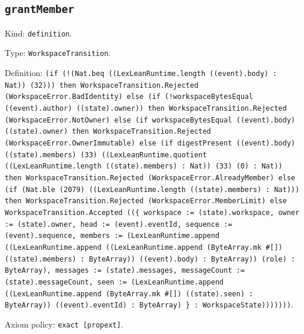 \documentclass[11pt]{article}
\begin{document}
\subsection*{\texttt{grantMember}}
\noindent Kind: \texttt{definition}.\par
\noindent Type: \texttt{WorkspaceTransition}.\par
\noindent Definition: \texttt{(if (!(Nat.beq ((LexLeanRuntime.length ((event).body) : Nat)) (32))) then WorkspaceTransition.Rejected (WorkspaceError.BadIdentity) else (if (!workspaceBytesEqual ((event).author) ((state).owner)) then WorkspaceTransition.Rejected (WorkspaceError.NotOwner) else (if workspaceBytesEqual ((event).body) ((state).owner) then WorkspaceTransition.Rejected (WorkspaceError.OwnerImmutable) else (if digestPresent ((event).body) ((state).members) (33) ((LexLeanRuntime.quotient ((LexLeanRuntime.length ((state).members) : Nat)) (33) (0) : Nat)) then WorkspaceTransition.Rejected (WorkspaceError.AlreadyMember) else (if (Nat.ble (2079) ((LexLeanRuntime.length ((state).members) : Nat))) then WorkspaceTransition.Rejected (WorkspaceError.MemberLimit) else WorkspaceTransition.Accepted ((\{ workspace := (state).workspace, owner := (state).owner, head := (event).eventId, sequence := (event).sequence, members := (LexLeanRuntime.append ((LexLeanRuntime.append ((LexLeanRuntime.append (ByteArray.mk \#[]) ((state).members) : ByteArray)) ((event).body) : ByteArray)) (role) : ByteArray), messages := (state).messages, messageCount := (state).messageCount, seen := (LexLeanRuntime.append ((LexLeanRuntime.append (ByteArray.mk \#[]) ((state).seen) : ByteArray)) ((event).eventId) : ByteArray) \} : WorkspaceState)))))))}.\par
\noindent Axiom policy: \texttt{exact [propext]}.\par
\end{document}
